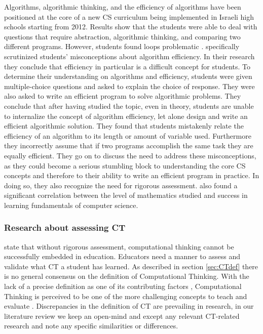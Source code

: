 Algorithms, algorithmic thinking, and the efficiency of algorithms have been positioned at the core of a new CS curriculum being implemented in Israeli high schools starting from 2012. Results show that the students were able to deal with questions that require abstraction, algorithmic thinking, and comparing two different programs. However, students found loops problematic \cite{zur-burgury2013israelExam}.  specifically scrutinized students' misconceptions about algorithm efficiency. In their research they conclude that efficiency in particular is a difficult concept for students. To determine their understanding on algorithms and efficiency, students were given multiple-choice questions and asked to explain the choice of response. They were also asked to write an efficient program to solve algorithmic problems. They conclude that after having studied the topic, even in theory, students are unable to internalize the concept of algorithm efficiency, let alone design and write an efficient algorithmic solution. They found that students mistakenly relate the efficiency of an algorithm to its length or amount of variable used. Furthermore they incorrectly assume that if two programs accomplish the same task they are equally efficient. They go on to discuss the need to address these misconceptions, as they could become a serious stumbling block to understanding the core CS concepts and therefore to their ability to write an efficient program in practice. In doing so, they also recognize the need for rigorous assessment.  also found a significant correlation between the level of mathematics studied and success in learning fundamentals of computer science.




\subsubsection{Research about assessing CT}


 state that without rigorous assessment, computational thinking cannot be successfully embedded in education. Educators need a manner to assess and validate what CT a student has learned. As described in section \ref{sec:CTdef} there is no general consensus on the definition of Computational Thinking. With the lack of a precise definition as one of its contributing factors \cite{crick2017}, Computational Thinking is perceived to be one of the more challenging concepts to teach and evaluate \cite{BrennanResnick2012}. Discrepancies in the definition of CT are prevailing in research, in our literature review we keep an open-mind and except any relevant CT-related research and note any specific similarities or differences.


